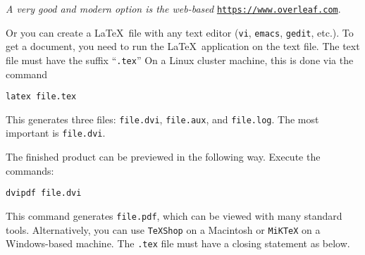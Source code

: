 \documentclass{article}
\begin{document}
\medskip
{}
\medskip

{\em A very good and modern option is the web-based} \href{https://www.overleaf.com}{\tt https://www.overleaf.com}.

Or you can create a \LaTeX~file with any text editor ({\tt vi}, {\tt emacs}, {\tt gedit}, 
etc.). 
To get a document, you need to run the \LaTeX~application
on the text file.  The text file must have the suffix ``{\tt .tex}''
On a Linux cluster machine, this is done via the command

\medskip
{\tt latex file.tex}

\medskip
\noindent
This generates three files: {\tt file.dvi}, {\tt file.aux},
and {\tt file.log}.  The most important is {\tt file.dvi}. 

\medskip
\noindent
The finished product can be previewed in the following way.
Execute the commands:

\medskip

{\tt dvipdf file.dvi}\hspace{1.9in}{\em Linux System}

\medskip
\noindent
This command generates {\tt file.pdf}, which can be viewed with many standard tools.
Alternatively, you can use {\tt TeXShop} on a Macintosh or {\tt MiKTeX} on a Windows-based machine. 
The {\tt .tex} file must have a closing statement as
below.
\end{document}
